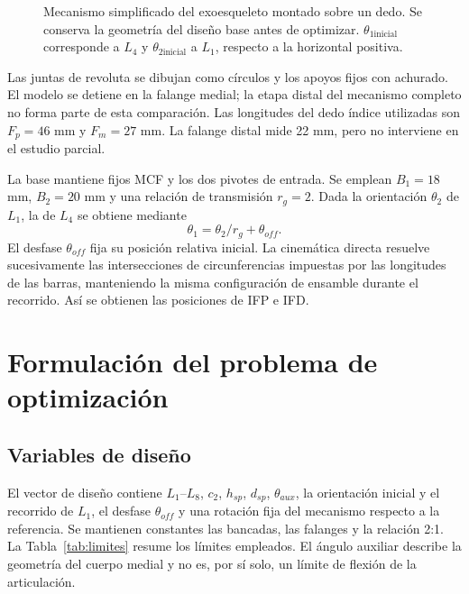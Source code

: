 \documentclass[conference,letterpaper]{IEEEtran}
\begin{document}
\begin{figure}[t]
\centering
\caption{Mecanismo simplificado del exoesqueleto montado sobre un dedo. Se conserva la geometría del diseño base antes de optimizar. $\theta_{1\mathrm{inicial}}$ corresponde a $L_4$ y $\theta_{2\mathrm{inicial}}$ a $L_1$, respecto a la horizontal positiva.}
\label{fig:dedo}
\end{figure}

Las juntas de revoluta se dibujan como círculos y los apoyos fijos con achurado. El modelo se detiene en la falange medial; la etapa distal del mecanismo completo no forma parte de esta comparación. Las longitudes del dedo índice utilizadas son $F_p=46$ mm y $F_m=27$ mm. La falange distal mide 22 mm, pero no interviene en el estudio parcial.

La base mantiene fijos MCF y los dos pivotes de entrada. Se emplean $B_1=18$ mm, $B_2=20$ mm y una relación de transmisión $r_g=2$. Dada la orientación $\theta_2$ de $L_1$, la de $L_4$ se obtiene mediante
\begin{equation}
\theta_1=\theta_2/r_g+\theta_{off}.
\end{equation}
El desfase $\theta_{off}$ fija su posición relativa inicial. La cinemática directa resuelve sucesivamente las intersecciones de circunferencias impuestas por las longitudes de las barras, manteniendo la misma configuración de ensamble durante el recorrido. Así se obtienen las posiciones de IFP e IFD.

\section{Formulación del problema de optimización}
\subsection{Variables de diseño}
El vector de diseño contiene $L_1$--$L_8$, $c_2$, $h_{sp}$, $d_{sp}$, $\theta_{aux}$, la orientación inicial y el recorrido de $L_1$, el desfase $\theta_{off}$ y una rotación fija del mecanismo respecto a la referencia. Se mantienen constantes las bancadas, las falanges y la relación 2:1. La Tabla~\ref{tab:limites} resume los límites empleados. El ángulo auxiliar describe la geometría del cuerpo medial y no es, por sí solo, un límite de flexión de la articulación.
\end{document}
